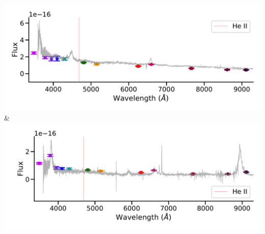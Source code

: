 \includegraphics[width=0.5\linewidth, clip]{spec-9399-58125-0723.pdf} & \includegraphics[width=0.5\linewidth, clip]{spec-9409-58051-0529.pdf} \\
